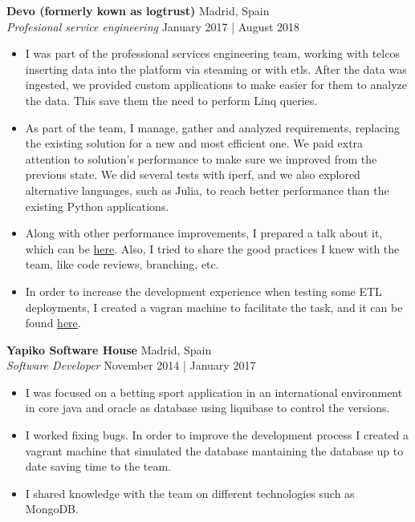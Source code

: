 \documentclass[a4paper]{article}
\begin{document}
\textbf{Devo (formerly kown as logtrust)} \hfill Madrid, Spain\\
\textit{Profesional service engineering} \hfill January 2017 | August 2018\\
\vspace{-1mm}
\begin{itemize} \itemsep 1pt
	\item I was part of the professional services engineering team, working with telcos inserting data into the platform via steaming or with etls. After the data was ingested, we provided custom applications to make easier for them to analyze the data. This save them the need to perform Linq queries.
	\item As part of the team, I manage, gather and analyzed requirements, replacing the existing solution for a new and most efficient one. We paid extra attention to solution's performance to make sure we improved from the previous state. We did several tests with iperf, and we also explored alternative languages, such as Julia, to reach better performance than the existing Python applications.
	\item Along with other performance improvements, I prepared a talk about it, which can be \href{https://github.com/dionisioC/pythonPerformance}{here}. Also, I tried to share the good practices I knew with the team, like code reviews, branching, etc.
	\item In order to increase the development experience when testing some ETL deployments, I created a vagran machine to facilitate the task, and it can be found \href{https://github.com/dionisioC/azkaban_in_vagrant_with_ansible}{here}. 
\end{itemize}

\textbf{Yapiko Software House} \hfill Madrid, Spain\\
\textit{Software Developer} \hfill November 2014 | January 2017\\
\vspace{-1mm}
\begin{itemize} \itemsep 1pt
	\item I was focused on a betting sport application in an international environment in core java and oracle as database using liquibase to control the versions.
	\item I worked fixing bugs. In order to improve the development process I created a vagrant machine that simulated the database mantaining the database up to date saving time to the team.
	\item I shared knowledge with the team on different technologies such as MongoDB.
\end{itemize}
\end{document}
